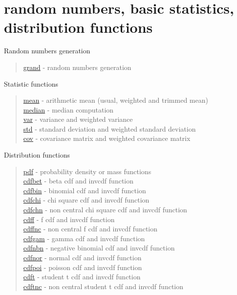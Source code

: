\chapter*{random numbers, basic statistics, distribution functions}

Random numbers generation

\begin{quote}
\noindent
\hyperlink{grand}{grand} - random numbers generation
\end{quote}

Statistic functions

\begin{quote}
\noindent
\hyperlink{mean}{mean} - arithmetic mean (usual, weighted and trimmed mean)\\
\hyperlink{median}{median} - median computation\\
\hyperlink{var}{var} - variance and weighted variance\\
\hyperlink{std}{std} - standard deviation and weighted standard deviation\\
\hyperlink{cov}{cov} - covariance matrix and weighted covariance matrix\\
\end{quote}



Distribution functions

\begin{quote}
\noindent
\hyperlink{pdf}{pdf} - probability density or mass functions \\
\hyperlink{cdfbet}{cdfbet} - beta cdf and invcdf function \\
\hyperlink{cdfbin}{cdfbin} - binomial cdf and invcdf function \\
\hyperlink{cdfchi}{cdfchi} - chi square cdf and invcdf function \\
\hyperlink{cdfchn}{cdfchn} - non central chi square cdf and invcdf function \\
\hyperlink{cdff}{cdff} - f cdf and invcdf function \\
\hyperlink{cdffnc}{cdffnc} - non central f cdf and invcdf function \\
\hyperlink{cdfgam}{cdfgam} - gamma cdf and invcdf function \\
\hyperlink{cdfnbn}{cdfnbn} - negative binomial cdf and invcdf function \\
\hyperlink{cdfnor}{cdfnor} - normal cdf and invcdf function \\
\hyperlink{cdfpoi}{cdfpoi} - poisson cdf and invcdf function \\
\hyperlink{cdft}{cdft} - student t cdf and invcdf function \\
\hyperlink{cdftnc}{cdftnc} - non central student t cdf and invcdf function \\
\end{quote}



